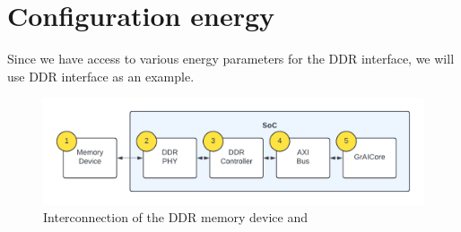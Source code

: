 \section{Configuration energy}
Since we have access to various energy parameters for the DDR interface, we will use DDR interface as an example.

\begin{figure}[hbtp]
    \centering
    \includegraphics[width=\linewidth]{assets/ddr_graicore_block_diagram.pdf}
    \caption{
        Interconnection of the DDR memory device and \graicore{}
    }
    \label{fig:ddr_graicore_block_diagram}
\end{figure}



